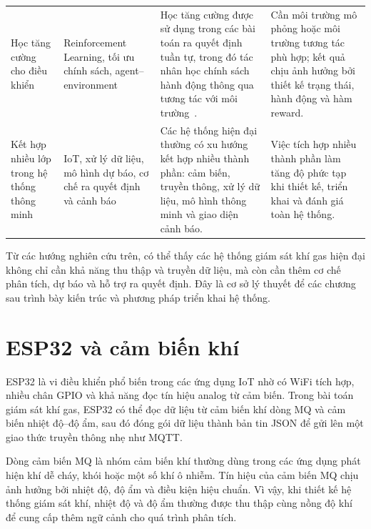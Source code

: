 \begin{longtable}{
  >{\raggedright\arraybackslash}p{2.8cm}
  >{\raggedright\arraybackslash}p{3.5cm}
  >{\raggedright\arraybackslash}p{4.2cm}
  >{\raggedright\arraybackslash}p{3.2cm}
}
\addlinespace

Học tăng cường cho điều khiển
& Reinforcement Learning, tối ưu chính sách, agent--environment
& Học tăng cường được sử dụng trong các bài toán ra quyết định tuần tự, trong đó tác nhân học chính sách hành động thông qua tương tác với môi trường~\cite{wei2022}.
& Cần môi trường mô phỏng hoặc môi trường tương tác phù hợp; kết quả chịu ảnh hưởng bởi thiết kế trạng thái, hành động và hàm reward. \\

\addlinespace

Kết hợp nhiều lớp trong hệ thống thông minh
& IoT, xử lý dữ liệu, mô hình dự báo, cơ chế ra quyết định và cảnh báo
& Các hệ thống hiện đại thường có xu hướng kết hợp nhiều thành phần: cảm biến, truyền thông, xử lý dữ liệu, mô hình thông minh và giao diện cảnh báo.
& Việc tích hợp nhiều thành phần làm tăng độ phức tạp khi thiết kế, triển khai và đánh giá toàn hệ thống. \\

\end{longtable}
\endgroup

Từ các hướng nghiên cứu trên, có thể thấy các hệ thống giám sát khí gas hiện đại không chỉ cần khả năng thu thập và truyền dữ liệu, mà còn cần thêm cơ chế phân tích, dự báo và hỗ trợ ra quyết định. Đây là cơ sở lý thuyết để các chương sau trình bày kiến trúc và phương pháp triển khai hệ thống.

\section{ESP32 và cảm biến khí}

ESP32 là vi điều khiển phổ biến trong các ứng dụng IoT nhờ có WiFi tích hợp, nhiều chân GPIO và khả năng đọc tín hiệu analog từ cảm biến. Trong bài toán giám sát khí gas, ESP32 có thể đọc dữ liệu từ cảm biến khí dòng MQ và cảm biến nhiệt độ--độ ẩm, sau đó đóng gói dữ liệu thành bản tin JSON để gửi lên một giao thức truyền thông nhẹ như MQTT.


Dòng cảm biến MQ là nhóm cảm biến khí thường dùng trong các ứng dụng phát hiện khí dễ cháy, khói hoặc một số khí ô nhiễm. Tín hiệu của cảm biến MQ chịu ảnh hưởng bởi nhiệt độ, độ ẩm và điều kiện hiệu chuẩn. Vì vậy, khi thiết kế hệ thống giám sát khí, nhiệt độ và độ ẩm thường được thu thập cùng nồng độ khí để cung cấp thêm ngữ cảnh cho quá trình phân tích.


